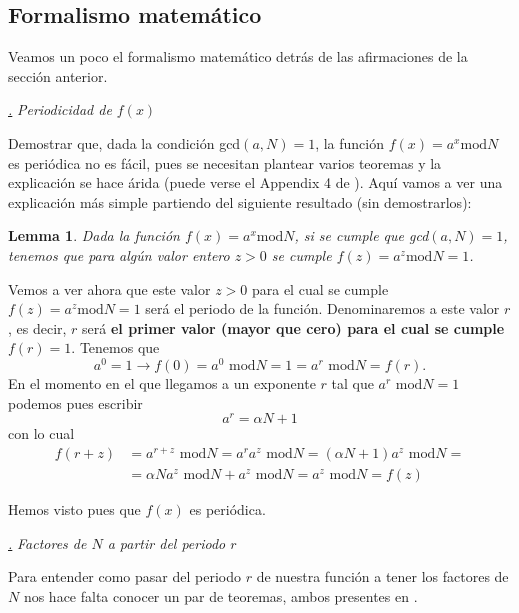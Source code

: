 \documentclass[a4paper,11pt]{book} %
\newtheorem{lemma_contador}{Lemma}
\newcommand{\Lemma}[1]{
		\begin{mybox_gray2}{}
			\begin{lemma_contador}
				 #1 
			\end{lemma_contador} 
		\end{mybox_gray2}
	}
\numberwithin{equation}{chapter}
\def\subsubiContadorIt{\par\addtocounter{subsubsection}{1}\underline{\it\thesubsubsection.}\hskip0.5cm \setcounter{subsubsubsectionIt}{0}}
\newcommand{\SubsubiIt}[1]{
		\subsubiContadorIt \textit{#1}
	}
\newcounter{subsubsubsectionIt}[subsubsection]
\begin{document}
\subsection{Formalismo matemático} \label{sec_Formalismo}

Veamos un poco el formalismo matemático detrás de las afirmaciones de la sección anterior.

			\SubsubiIt{Periodicidad de $f(x)$}

Demostrar que, dada la condición gcd$(a,N) = 1$, la función $f(x) = a^x \text{mod} N$ es periódica no es fácil, pues se necesitan plantear varios teoremas y la explicación se hace árida (puede verse el Appendix 4 de \cite{bib_nielsen}). Aquí vamos a ver una explicación más simple partiendo del siguiente resultado (sin demostrarlos): 

	\Lemma{
	Dada la función $f(x) = a^x \text{mod} N$, si se cumple que gcd$(a,N) = 1$, tenemos que para algún valor entero $z>0$ se cumple $f(z) = a^z \text{mod} N = 1$. 
	}

Vemos a ver ahora que este valor $z>0$ para el cual se cumple $f(z) = a^z \text{mod} N = 1$ será el periodo de la función. Denominaremos a este valor $r$, es decir, $r$ será \textbf{el primer valor (mayor que cero) para el cual se cumple} $f(r) = 1$. Tenemos que 
	\begin{equation}
	a^0 =1 \rightarrow f(0) = a^0 \text{ mod} N = 1 = a^r \text{ mod} N = f(r).
	\end{equation}
En el momento en el que llegamos a un exponente $r$ tal que $a^r \text{ mod} N = 1$ podemos pues escribir
	\begin{equation}
	a^r = \alpha N + 1
	\end{equation}
con lo cual
\begin{equation} 
\begin{aligned}
f(r+z) & = a^{r+z} \text{ mod} N   = a^r a^z \text{ mod} N = (\alpha N + 1)a^z \text{ mod} N = \\ 
& = \alpha N a^z \text{ mod} N + a^z \text{ mod} N  = a^z \text{ mod} N = f(z)
\end{aligned}
\end{equation}

Hemos visto pues que $f(x)$ es periódica.

			\SubsubiIt{Factores de $N$ a partir del periodo $r$} \label{sec_factores}
			
Para entender como pasar del periodo $r$ de nuestra función a tener los factores de $N$ nos hace falta conocer un par de teoremas, ambos presentes en \cite{bib_nielsen}.
\end{document}
